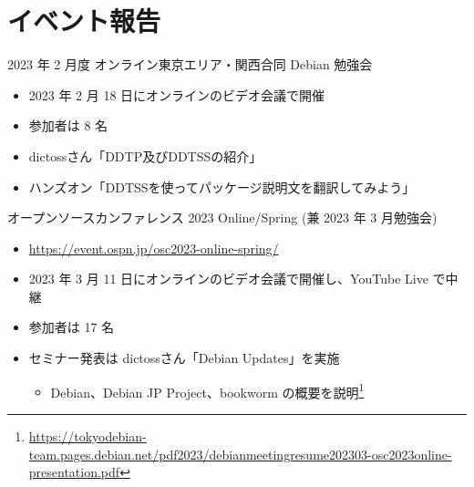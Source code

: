 \section{イベント報告}

\begin{frame}{2023 年 2 月度 オンライン東京エリア・関西合同 Debian 勉強会}
\begin{itemize}
\item 2023 年 2 月 18 日にオンラインのビデオ会議で開催
\item 参加者は 8 名
\item dictossさん「DDTP及びDDTSSの紹介」
\item ハンズオン「DDTSSを使ってパッケージ説明文を翻訳してみよう」
\end{itemize}
\end{frame}

\begin{frame}{オープンソースカンファレンス 2023 Online/Spring (兼 2023 年 3 月勉強会)}
\begin{itemize}
\item \url{https://event.ospn.jp/osc2023-online-spring/}
\item 2023 年 3 月 11 日にオンラインのビデオ会議で開催し、YouTube Live で中継
\item 参加者は 17 名
\item セミナー発表は dictossさん「Debian Updates」を実施
  \begin{itemize}
  \item Debian、Debian JP Project、bookworm の概要を説明\footnote{\url{https://tokyodebian-team.pages.debian.net/pdf2023/debianmeetingresume202303-osc2023online-presentation.pdf}}
  \end{itemize}
\end{itemize}
\end{frame}

